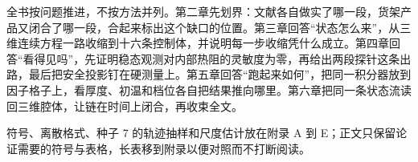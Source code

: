 全书按问题推进，不按方法并列。第二章先划界：文献各自做实了哪一段，货架产品又闭合了哪一段，合起来标出这个缺口的位置。第三章回答“状态怎么来”，从三维连续方程一路收缩到十六条控制体，并说明每一步收缩凭什么成立。第四章回答“看得见吗”，先证明稳态观测对内部热阻的灵敏度为零，再给出两段探针这条出路，最后把安全投影钉在硬测量上。第五章回答“跑起来如何”，把同一积分器放到因子格子上，看厚度、初温和档位各自把结果推向哪里。第六章把同一条状态流读回三维腔体，让链在时间上闭合，再收束全文。

符号、离散格式、种子 7 的轨迹抽样和尺度估计放在附录 A 到 E；正文只保留论证需要的符号与表格，长表移到附录以便对照而不打断阅读。
